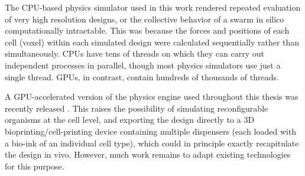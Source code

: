 The CPU-based physics simulator used in this work rendered repeated evaluation of very high resolution designs, or the collective behavior of a swarm in silico computationally intractable.
This was because the forces and positions of each cell (voxel) within each simulated design were calculated sequentially rather than simultaneously. 
CPUs have tens of threads on which they can carry out independent processes in parallel, though most physics simulators use just a single thread. 
GPUs, in contrast, contain hundreds of thousands of threads.

A GPU-accelerated version of the physics engine used throughout this thesis was recently released \cite{liu_voxcraft_2020}.
This raises the possibility of simulating reconfigurable organisms at the cell level, and exporting the design directly to a 3D bioprinting/cell-printing device containing multiple dispensers (each loaded with a bio-ink of an individual cell type), which could in principle exactly recapitulate the design in vivo. 
However, much work remains to adapt existing technologies for this purpose.











